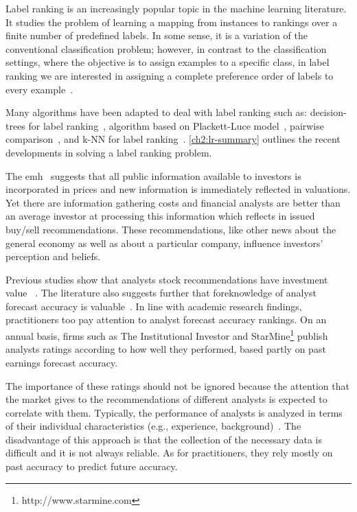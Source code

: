 Label ranking is an increasingly popular topic in the machine learning literature. It studies the problem of learning a mapping from instances to rankings over a finite number of predefined labels. In some sense, it is a variation of the conventional classification problem; however, in contrast to the classification settings, where the objective is to assign examples to a specific class, in label ranking we are interested in assigning a complete preference order of labels to every example~\citep{cheng2009}.

Many algorithms have been adapted to deal with label ranking such as: decision-trees for label ranking~\citep{cheng2009}, algorithm based on Plackett-Luce model~\citep{cheng2010}, pairwise comparison~\citep{hullermeier}, and k-NN for label ranking~\citep{brazdil2003}. \ref{ch2:lr-summary} outlines the recent developments in solving a label ranking problem.



The \gls{emh}~\citep{fama1970ecm} suggests that all public information available to investors is incorporated in prices and new information is immediately reflected in valuations. Yet there are information gathering costs and financial analysts are better than an average investor at processing this information which reflects in issued buy/sell recommendations. These recommendations, like other news about the general economy as well as about a particular company, influence investors' perception and beliefs.

Previous studies show that analysts stock recommendations have investment value ~\citep{womack1996,barber2001}. The literature also suggests further that foreknowledge of analyst forecast accuracy is valuable~\citep{brown2003,aiguzhinov2015a}. In line with academic research findings, practitioners too pay attention to analyst forecast accuracy rankings. On an annual basis, firms such as The Institutional Investor and StarMine\footnote{http://www.starmine.com} publish analysts ratings according to how well they performed, based partly on past earnings forecast accuracy.

The importance of these ratings should not be ignored because the attention that the market gives to the recommendations of different analysts is expected to correlate with them. Typically, the performance of analysts is analyzed in terms of their individual characteristics (e.g., experience, background)~\citep{clement1999}. The disadvantage of this approach is that the collection of the necessary data is difficult and it is not always reliable. As for practitioners, they rely mostly on past accuracy to predict future accuracy.




